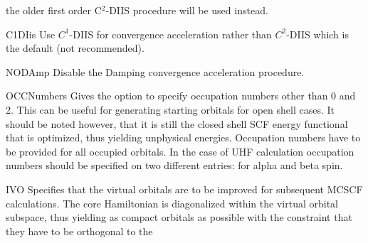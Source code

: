 \begin{keywordlist}
the older first order C$^2$-DIIS procedure will be used instead.
\item[C1DIis]
Use $C^1$-DIIS for convergence acceleration rather than $C^2$-DIIS
which is the default (not recommended).
\item[NODAmp]
Disable the Damping convergence acceleration procedure.
\item[OCCNumbers]
Gives the option to specify occupation numbers other than 0 and 2.
This can be useful for generating starting orbitals for open shell
cases. It should be noted however, that it is still the closed shell
SCF energy functional that is optimized, thus yielding unphysical
energies. Occupation numbers have to be provided for all occupied
orbitals.
In the case of UHF calculation occupation numbers should be specified
on two different entries: for alpha and beta spin.
\item[IVO]
Specifies that the virtual orbitals are to be improved for
subsequent MCSCF calculations. The core Hamiltonian is diagonalized
within the virtual orbital subspace, thus yielding as compact orbitals
as possible with the constraint that they have to be orthogonal to the

\end{keywordlist}

